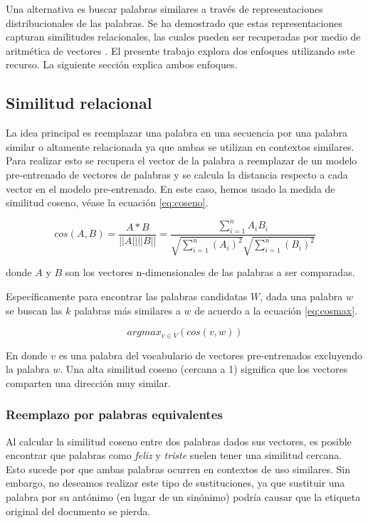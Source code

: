 Una alternativa es buscar palabras similares a través de representaciones distribucionales de las palabras. Se ha demostrado que estas representaciones capturan  similitudes relacionales, las cuales pueden ser recuperadas por medio de aritmética de vectores \citep{levy2014linguistic}. El presente trabajo explora dos enfoques utilizando este recurso. La siguiente sección explica ambos enfoques. 

\subsection{Similitud relacional}
La idea principal es reemplazar una palabra en una secuencia por una palabra similar o altamente relacionada ya que ambas se utilizan en contextos similares. Para realizar esto se recupera el vector de la palabra a reemplazar de un modelo pre-entrenado de vectores de palabras y se calcula la distancia respecto a cada vector en el modelo pre-entrenado. En este caso, hemos usado la medida de similitud coseno, véase la ecuación \ref{eq:coseno}.

\begin{equation}
\label{eq:coseno}
    cos(A,B)=\frac{A*B}{||A||||B||} = \frac{\sum_{i=1}^{n}A_i B_i}{\sqrt{\sum_{i=1}^{n}(A_i)^2} \sqrt{\sum_{i=1}^{n}(B_i)^2} }
\end{equation}

donde $A$ y $B$ son los vectores n-dimensionales de las palabras a ser comparadas.

Específicamente para encontrar las palabras candidatas $W$, dada una palabra $w$ se buscan las $k$ palabras más similares a $w$ de acuerdo a la ecuación \ref{eq:cosmax}.

\begin{equation}
    \label{eq:cosmax}
    argmax_{v \in V} (cos(v, w))
\end{equation}

En donde $v$ es una palabra del vocabulario de vectores pre-entrenados excluyendo la palabra $w$. Una alta similitud coseno (cercana a 1) significa que los vectores comparten una dirección muy similar.

\subsubsection{Reemplazo por palabras equivalentes}
Al calcular la similitud coseno entre dos palabras dados sus vectores, es posible encontrar que palabras como \textit{feliz} y \textit{triste} suelen tener una similitud cercana. Esto sucede por que ambas palabras ocurren en contextos de uso similares. Sin embargo, no deseamos realizar este tipo de sustituciones, ya que sustituir una palabra por su antónimo (en lugar de un sinónimo) podría causar que la etiqueta original del documento se pierda. 
 
